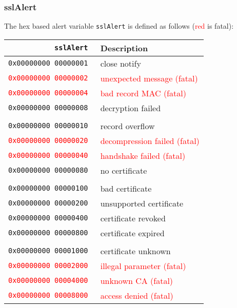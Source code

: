 \documentclass[documentation]{subfiles}
\begin{document}
\subsubsection{sslAlert}\label{sslAlert}
The hex based alert variable {\tt sslAlert} is defined as follows (\textcolor{red}{red} is fatal):\\
\begin{minipage}{.48\textwidth}
    \small
    \begin{longtable}{>{\tt}rl}
        \toprule
        {\bf sslAlert} & {\bf Description} \\
        \midrule\endhead%
                           0x00000000 00000001  & close notify\\
        \textcolor{red}   {0x00000000 00000002} & \textcolor{red}{unexpected message (fatal)}\\
        \textcolor{red}   {0x00000000 00000004} & \textcolor{red}{bad record MAC (fatal)}\\
                           0x00000000 00000008  & decryption failed\\
        \\
                           0x00000000 00000010  & record overflow\\
        \textcolor{red}   {0x00000000 00000020} & \textcolor{red}{decompression failed (fatal)}\\
        \textcolor{red}   {0x00000000 00000040} & \textcolor{red}{handshake failed (fatal)}\\
                           0x00000000 00000080  & no certificate\\
        \\
                           0x00000000 00000100  & bad certificate\\
                           0x00000000 00000200  & unsupported certificate\\
                           0x00000000 00000400  & certificate revoked\\
                           0x00000000 00000800  & certificate expired\\
        \\
                           0x00000000 00001000  & certificate unknown\\
        \textcolor{red}   {0x00000000 00002000} & \textcolor{red}{illegal parameter (fatal)}\\
        \textcolor{red}   {0x00000000 00004000} & \textcolor{red}{unknown CA (fatal)}\\
        \textcolor{red}   {0x00000000 00008000} & \textcolor{red}{access denied (fatal)}\\

\end{longtable}
\end{minipage}
\end{document}
